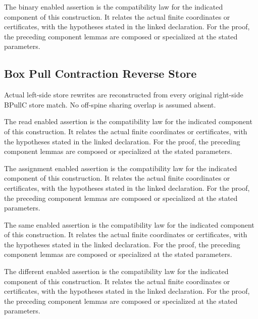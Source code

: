 The binary enabled assertion is the compatibility law for the indicated component of this construction. It relates the actual finite coordinates or certificates, with the hypotheses stated in the linked declaration.
For the proof, the preceding component lemmas are composed or specialized at the stated parameters.
\par{}

\subsection{Box Pull Contraction Reverse Store}
Actual left-side store rewrites are reconstructed from every original right-side BPullC store match. No off-spine sharing overlap is assumed absent.

The read enabled assertion is the compatibility law for the indicated component of this construction. It relates the actual finite coordinates or certificates, with the hypotheses stated in the linked declaration.
For the proof, the preceding component lemmas are composed or specialized at the stated parameters.
\par{}

The assignment enabled assertion is the compatibility law for the indicated component of this construction. It relates the actual finite coordinates or certificates, with the hypotheses stated in the linked declaration.
For the proof, the preceding component lemmas are composed or specialized at the stated parameters.
\par{}

The same enabled assertion is the compatibility law for the indicated component of this construction. It relates the actual finite coordinates or certificates, with the hypotheses stated in the linked declaration.
For the proof, the preceding component lemmas are composed or specialized at the stated parameters.
\par{}

The different enabled assertion is the compatibility law for the indicated component of this construction. It relates the actual finite coordinates or certificates, with the hypotheses stated in the linked declaration.
For the proof, the preceding component lemmas are composed or specialized at the stated parameters.
\par{}


